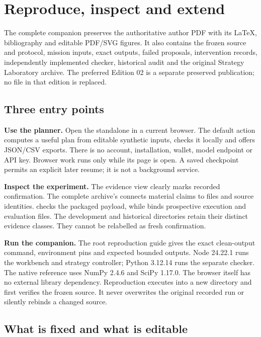 \section{Reproduce, inspect and extend}

The complete companion preserves the authoritative author PDF with its LaTeX, bibliography and editable PDF/SVG figures. It also contains the frozen source and protocol, mission inputs, exact outputs, failed proposals, intervention records, independently implemented checker, historical audit and the original Strategy Laboratory archive. The preferred Edition 02 is a separate preserved publication; no file in that edition is replaced.

\subsection{Three entry points}

\textbf{Use the planner.} Open the standalone  in a current browser. The default action computes a useful plan from editable synthetic inputs, checks it locally and offers JSON/CSV exports. There is no account, installation, wallet, model endpoint or API key. Browser work runs only while its page is open. A saved checkpoint permits an explicit later resume; it is not a background service.

\textbf{Inspect the experiment.} The evidence view clearly marks recorded confirmation. The complete archive's  connects material claims to files and source identities.  checks the packaged payload, while  binds prospective execution and evaluation files. The development and historical directories retain their distinct evidence classes. They cannot be relabelled as fresh confirmation.

\textbf{Run the companion.} The root reproduction guide gives the exact clean-output command, environment pins and expected bounded outputs. Node 24.22.1 runs the workbench and strategy controller; Python 3.12.14 runs the separate checker. The native reference uses NumPy 2.4.6 and SciPy 1.17.0. The browser itself has no external library dependency. Reproduction executes into a new directory and first verifies the frozen source. It never overwrites the original recorded run or silently rebinds a changed source.

\subsection{What is fixed and what is editable}

